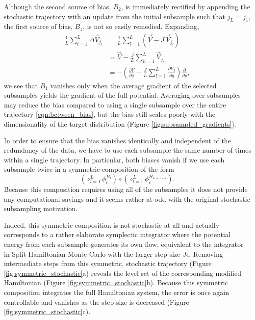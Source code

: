 \documentclass{article}
\begin{document}
Although the second source of bias, $B_{2}$, is immediately rectified by appending the 
stochastic trajectory with an update from the initial subsample such that $j_{L} = j_{1}$, 
the first source of bias, $B_{1}$, is not so easily remedied.  Expanding,
%
\begin{align*}
\frac{1}{L} \sum_{l = 1}^{L}  \overrightarrow{ \Delta V}_{j_{l}}
&=
\frac{1}{L} \sum_{l = 1}^{L} \left( \vec{V} - J \, \vec{V}_{j_{l}} \right)
\\
&=
\vec{V} - \frac{J}{L} \sum_{n = 1}^{L} \vec{V}_{j_{l}}
\\
&=
- \left( \frac{ \partial V }{ \partial q }  - \frac{J}{L} \sum_{l = 1}^{L} \frac{ \partial V_{j} }{ \partial q }
\right) \frac{ \partial }{ \partial p },
\end{align*}
%
we see that $B_{1}$ vanishes only when the average gradient of the selected 
subsamples yields the gradient of the full potential.  Averaging over subsamples 
may reduce the bias compared to using a single subsample over the entire
trajectory \eqref{eqn:between_bias}, but the bias still scales poorly with the 
dimensionality of the target distribution (Figure \ref{fig:subsampled_gradients}).

In order to ensure that the bias vanishes identically and independent of the redundancy
of the data, we have to use each subsample the same number of times within a single 
trajectory.  In particular, both biases vanish if we use each subsample twice in a symmetric 
composition of the form
%
\begin{equation*}
\left( \circ_{l = 1}^{L} \phi^{H_{l}}_{\epsilon} \right)
\circ 
\left( \circ_{l = 1}^{L} \phi^{H_{L + 1 - l}}_{\epsilon} \right).
\end{equation*}
%
Because this composition requires using all of the subsamples it does not provide
any computational savings and it seems rather at odd with the original stochastic 
subsampling motivation. 

Indeed, this symmetric composition is not stochastic at all and actually corresponds 
to a rather elaborate symplectic integrator where the potential energy from each subsample 
generates its own flow, equivalent to the integrator in Split Hamiltonian Monte Carlo 
\cite{ShahbabaEtAl:2014} with the larger step size $J \epsilon$.  Removing intermediate 
steps from this symmetric, stochastic trajectory (Figure \ref{fig:symmetric_stochastic}a) 
reveals the level set of the corresponding modified Hamiltonian 
(Figure \ref{fig:symmetric_stochastic}b).  Because this symmetric composition integrates 
the full Hamiltonian system, the error is once again controllable and vanishes as the step 
size is decreased (Figure \ref{fig:symmetric_stochastic}c).
\end{document}

